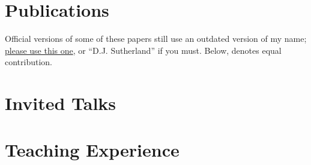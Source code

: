 \documentclass[11pt,sans]{moderncv}
\newcommand{\bibeqcon}{\textcolor{blue}{\footnotemark[1]}}
\begin{document}
\section{Publications}
\renewcommand{\thefootnote}{\fnsymbol{footnote}\fnsymbol{footnote}}
\setlength{}
Official versions of some of these papers still use an outdated version of my name; {\href{https://tesstanenbaum.medium.com/towards-a-trans-inclusive-publishing-landscape-893339b9868d}{\color{blue} please use this one}}, or ``D.J. Sutherland'' if you must.
Below, \bibeqcon{} denotes equal contribution.
\nocite{*}
{%

{%
\printbibliography[category=sec{{ loop.index }},title={ {{- sec_name -}} },heading=subbibnumbered]{}
{%

{%
\section{Invited Talks}
\newcommand{\talk}[3]{%
  \item[#1]%
    \ifthenelse{\equal{#2}{}}{}{\textit{#2}. \\}
    #3
}

\section{Teaching Experience}

}}}}
\end{document}
